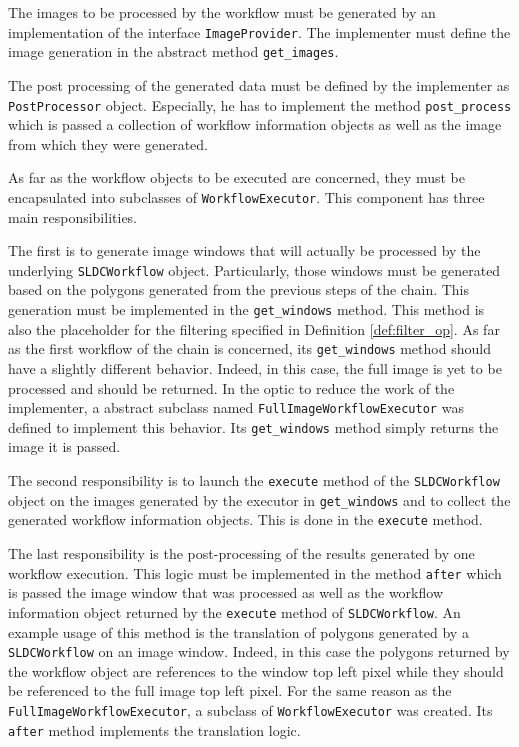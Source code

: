 The images to be processed by the workflow must be generated by an implementation of the interface \texttt{ImageProvider}. The implementer must define the image generation in the abstract method \texttt{get\_images}. 

The post processing of the generated data must be defined by the implementer as \texttt{PostProcessor} object. Especially, he has to implement the method \texttt{post\_process} which is passed a collection of workflow information objects as well as the image from which they were generated.

As far as the workflow objects to be executed are concerned, they must be encapsulated into subclasses of \texttt{WorkflowExecutor}. This component has three main responsibilities. 

The first is to generate image windows that will actually be processed by the underlying \texttt{SLDCWorkflow} object. Particularly, those windows must be generated based on the polygons generated from the previous steps of the chain. This generation must be implemented in the \texttt{get\_windows} method. This method is also the placeholder for the filtering specified in Definition \ref{def:filter_op}. As far as the first workflow of the chain is concerned, its \texttt{get\_windows} method should have a slightly different behavior. Indeed, in this case, the full image is yet to be processed and should be returned. In the optic to reduce the work of the implementer, a abstract subclass named \texttt{FullImageWorkflowExecutor} was defined to implement this behavior. Its \texttt{get\_windows} method simply returns the image it is passed. 

The second responsibility is to launch the \texttt{execute} method of the \texttt{SLDCWorkflow} object on the images generated by the executor in \texttt{get\_windows} and to collect the generated workflow information objects. This is done in the \texttt{execute} method. 

The last responsibility is the post-processing of the results generated by one workflow execution. This logic must be implemented in the method \texttt{after} which is passed the image window that was processed as well as the workflow information object returned by the \texttt{execute} method of \texttt{SLDCWorkflow}. An example usage of this method is the translation of polygons generated by a \texttt{SLDCWorkflow} on an image window. Indeed, in this case the polygons returned by the workflow object are references to the window top left pixel while they should be referenced to the full image top left pixel. For the same reason as the \texttt{FullImageWorkflowExecutor}, a subclass of \texttt{WorkflowExecutor} was created. Its \texttt{after} method implements the translation logic.

